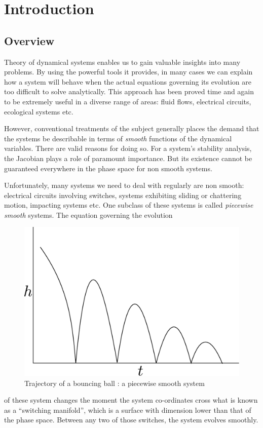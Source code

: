 \documentclass{book}
\renewcommand{\(}{\begin{columns}}
\renewcommand{\)}{\end{columns}}
\newcommand{\<}[1]{\begin{column}{#1}}
\renewcommand{\>}{\end{column}}
\begin{document}
\chapter{Introduction}
\section{Overview}
Theory of dynamical systems enables us to gain valuable insights into many problems.  By using the powerful 
tools it provides, in many cases we can explain how a system will behave 
when the actual equations governing its evolution are too difficult to solve 
analytically.  This approach has been proved time and again to be extremely 
useful in a diverse range of areas: fluid flows, electrical circuits, 
ecological systems etc.  

However, conventional treatments of the subject generally places the demand 
that the systems be describable in terms of \emph{smooth} functions of the 
dynamical variables. There are valid reasons for doing so.  For a system's 
stability analysis, the Jacobian plays a role of paramount importance.  But 
its existence cannot be guaranteed everywhere in the phase space for non 
smooth systems.  

Unfortunately, many systems we need to deal with regularly are non smooth: 
electrical circuits involving switches, systems exhibiting sliding or 
chattering motion, impacting systems etc.  One subclass of these systems is called  \emph{piecewise smooth} systems. The equation governing the evolution

\begin{figure}
\caption{Trajectory of a bouncing ball : a piecewise smooth system}
\begin{center}
\includegraphics[width=0.4\columnwidth]{bounce}
\end{center}
\end{figure}
 
of these system changes the moment  the system 
co-ordinates cross what is known as a ``switching manifold'', which is a 
surface with 
dimension lower than that of the phase space.  Between any two of those 
switches, the system evolves smoothly.  
\end{document}
